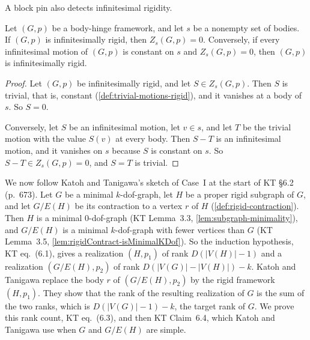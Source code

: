 A block pin also detects infinitesimal rigidity.

\begin{lemma}
  \label{lem:pinned-motions-on-rigid-iff}
  \leanok
  Let $(G,p)$ be a body-hinge framework, and let $s$ be a nonempty set of
  bodies. If $(G,p)$ is infinitesimally rigid, then $Z_s(G,p) = 0$.
  Conversely, if every infinitesimal motion of $(G,p)$ is constant on $s$
  and $Z_s(G,p) = 0$, then $(G,p)$ is infinitesimally rigid.
\end{lemma}
\begin{proof}
  \leanok
  Let $(G,p)$ be infinitesimally rigid, and let $S \in Z_s(G,p)$. Then
  $S$ is trivial, that is, constant (\cref{def:trivial-motions-rigid}),
  and it vanishes at a body of $s$. So $S = 0$.

  Conversely, let $S$ be an infinitesimal motion, let $v \in s$, and let
  $T$ be the trivial motion with the value $S(v)$ at every body. Then
  $S - T$ is an infinitesimal motion, and it vanishes on $s$ because $S$
  is constant on $s$. So $S - T \in Z_s(G,p) = 0$, and $S = T$ is
  trivial.
\end{proof}

We now follow Katoh and Tanigawa's sketch of Case~I at the start of KT
\S6.2 (p.~673). Let $G$ be a minimal $k$-dof-graph, let $H$ be a proper
rigid subgraph of $G$, and let $G/E(H)$ be its contraction to a vertex
$r$ of $H$ (\cref{def:rigid-contraction}). Then $H$ is a minimal
$0$-dof-graph (KT Lemma~3.3, \cref{lem:subgraph-minimality}), and
$G/E(H)$ is a minimal $k$-dof-graph with fewer vertices than $G$ (KT
Lemma~3.5, \cref{lem:rigidContract-isMinimalKDof}). So the induction
hypothesis, KT eq.~(6.1), gives a realization $(H, p_1)$ of rank
$D(|V(H)| - 1)$ and a realization $(G/E(H), p_2)$ of rank
$D(|V(G)| - |V(H)|) - k$. Katoh and Tanigawa replace the body $r$ of
$(G/E(H), p_2)$ by the rigid framework $(H, p_1)$. They show that the
rank of the resulting realization of $G$ is the sum of the two ranks,
which is $D(|V(G)| - 1) - k$, the target rank of $G$. We prove this rank
count, KT eq.~(6.3), and then KT Claim~6.4, which Katoh and Tanigawa use
when $G$ and $G/E(H)$ are simple.

